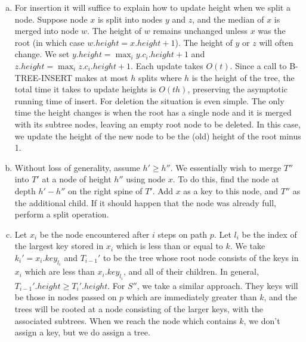 \documentclass{article}
\begin{document}
\begin{enumerate}[a.]
\item For insertion it will suffice to explain how to update height when we split a node.  Suppose node $x$ is split into nodes $y$ and $z$, and the median of $x$ is merged into node $w$.  The height of $w$ remains unchanged unless $x$ was the root (in which case $w.height = x.height + 1$).  The height of $y$ or $z$ will often change.  We set $y.height = \max_{i} y.c_i.height + 1$ and $z.height = \max_i z.c_i.height + 1$.  Each update takes $O(t)$.  Since a call to B-TREE-INSERT makes at most $h$ splits where $h$ is the height of the tree, the total time it takes to update heights is $O(th)$, preserving the asymptotic running time of insert.  For deletion the situation is even simple.  The only time the height changes is when the root has a single node and it is merged with its subtree nodes, leaving an empty root node to be deleted.  In this case, we update the height of the new node to be the (old) height of the root minus 1. \\

\item Without loss of generality, assume $h' \geq h''$.  We essentially wish to merge $T''$ into $T'$ at a node of height $h''$ using node $x$.  To do this, find the node at depth $h' - h''$ on the right spine of $T'$.   Add $x$ as a key to this node, and $T''$ as the additional child.  If it should happen that the node was already full, perform a split operation.  \\

\item Let $x_i$ be the node encountered after $i$ steps on path $p$.  Let $l_i$ be the index of the largest key stored in $x_i$ which is less than or equal to $k$. We take $k_i' = x_i.key_{l_i}$ and $T_{i-1}'$ to be the tree whose root node consists of the keys in $x_i$ which are less than $x_i.key_{l_i}$, and all of their children.  In general, $T_{i-1}'.height  \geq T_i'.height$. For $S''$, we take a similar approach. They keys will be those in nodes passed on $p$ which are immediately greater than $k$, and the trees will be rooted at a node consisting of the larger keys, with the associated subtrees. When we reach the node which contains $k$, we don't assign a key, but we do assign a tree.\\


\end{enumerate}
\end{document}
